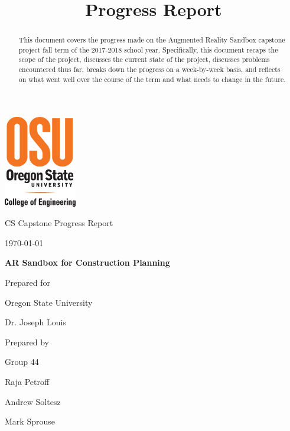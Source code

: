 \documentclass[onecolumn, draftclsnofoot,10pt, compsoc]{IEEEtran}
\title{Progress Report}
\def \CapstoneTeamName{		Team Sandy}
\def \CapstoneTeamNumber{		44}
\def \GroupMemberOne{			Raja Petroff			}
\def \GroupMemberTwo{			Andrew Soltesz			}
\def \GroupMemberThree{			Mark Sprouse}
\def \CapstoneProjectName{		AR Sandbox for Construction Planning}
\def \CapstoneSponsorCompany{	Oregon State University}
\def \CapstoneSponsorPerson{		Dr. Joseph Louis}
\def \DocType{		%
				Progress Report
				}
\newcommand{\NameSigPair}[1]{\par
\makebox[2.75in][r]{#1} \hfil 	\makebox[3.25in]{\makebox[2.25in]{\hrulefill} \hfill		\makebox[.75in]{\hrulefill}}
\par\vspace{-12pt} \textit{\tiny\noindent
\makebox[2.75in]{} \hfil		\makebox[3.25in]{\makebox[2.25in][r]{Signature} \hfill	\makebox[.75in][r]{Date}}}}
\renewcommand{\NameSigPair}[1]{#1}
\begin{document}
\begin{titlepage}
    \begin{singlespace}
    	\includegraphics[height=4cm]{coe_v_spot1}
        \hfill 
        \par\vspace{.2in}
        \centering
        \scshape{
            \huge CS Capstone \DocType \par
            {\large\today}\par
            \vspace{.5in}
            \textbf{\Huge\CapstoneProjectName}\par
            \vfill
            {\large Prepared for}\par
            \Huge \CapstoneSponsorCompany\par
            \vspace{5pt}
            {\Large\NameSigPair{\CapstoneSponsorPerson}\par}
            {\large Prepared by }\par
            Group\CapstoneTeamNumber\par
            \vspace{5pt}
            {\Large
                \NameSigPair{\GroupMemberOne}\par
                \NameSigPair{\GroupMemberTwo}\par
                \NameSigPair{\GroupMemberThree}\par
            }
            \vspace{20pt}
        }
        \begin{abstract}
        This document covers the progress made on the Augmented Reality Sandbox capstone project fall term of the 2017-2018 school year. Specifically, this document recaps the scope of the project, discusses the current state of the project, discusses problems encountered thus far, breaks down the progress on a week-by-week basis, and reflects on what went well over the course of the term and what needs to change in the future.
        \end{abstract}     
    \end{singlespace}
\end{titlepage}
\newpage
{}
\tableofcontents
\clearpage
\end{document}
